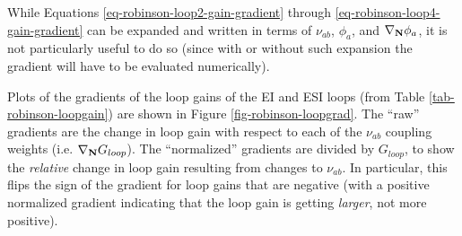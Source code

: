 While Equations \ref{eq-robinson-loop2-gain-gradient} through
\ref{eq-robinson-loop4-gain-gradient} can be expanded and written in terms
of $\nu_{ab}$, $\phi_{a}$, and $\nabla_{\mathbf{N}} \phi_{a}$, it is not particularly
useful to do so (since with or without such expansion the gradient will
have to be evaluated numerically).

Plots of the gradients of the loop gains of the EI and ESI loops (from
Table \ref{tab-robinson-loopgain}) are shown in Figure
\ref{fig-robinson-loopgrad}. The ``raw'' gradients are the change in loop
gain with respect to each of the $\nu_{ab}$ coupling weights (i.e.
$\nabla_{\mathbf{N}} G_{loop}$). The ``normalized'' gradients are divided by $G_{loop}$,
to show the \textit{relative} change in loop gain resulting from changes
to $\nu_{ab}$. In particular, this flips the sign of the gradient for
loop gains that are negative (with a positive normalized gradient indicating
that the loop gain is getting \textit{larger}, not more positive).

